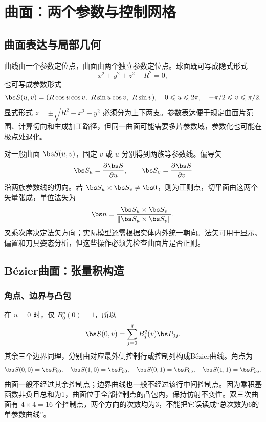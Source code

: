 \chapter{曲面：两个参数与控制网格}
\label{ch:surfaces}

\section{曲面表达与局部几何}

曲线由一个参数定位点，曲面由两个独立参数定位点。球面既可写成隐式形式
\[
 x^2+y^2+z^2-R^2=0,
\]
也可写成参数形式
\[
 \bs S(u,v)=(R\cos u\cos v,\ R\sin u\cos v,\ R\sin v),
 \quad0\leq u\leq2\pi,\quad-\pi/2\leq v\leq\pi/2.
\]
显式形式 $z=\pm\sqrt{R^2-x^2-y^2}$ 必须分为上下两支。参数表达便于规定曲面片范围、计算切向和生成加工路径，但同一曲面可能需要多片参数域，参数化也可能在极点处退化。

对一般曲面 $\bs S(u,v)$，固定 $v$ 或 $u$ 分别得到两族等参数线。偏导矢
\[
 \bs S_u=\frac{\partial\bs S}{\partial u},\qquad
 \bs S_v=\frac{\partial\bs S}{\partial v}
\]
沿两族参数线的切向。若 $\bs S_u\times\bs S_v\ne\bs0$，则为正则点，切平面由这两个矢量张成，单位法矢为
\[
 \bs n=\frac{\bs S_u\times\bs S_v}{\|\bs S_u\times\bs S_v\|}.
\]
叉乘次序决定法矢方向；实际模型还需根据实体内外统一朝向。法矢可用于显示、偏置和刀具姿态分析，但这些操作必须先检查曲面片是否正则。


\Needspace{6cm}
\section{Bézier曲面：张量积构造}



\subsection{角点、边界与凸包}
在 $u=0$ 时，仅 $B_0^p(0)=1$，所以
\[
 \bs S(0,v)=\sum_{j=0}^qB_j^q(v)\bs P_{0j}.
\]
其余三个边界同理，分别由对应最外侧控制行或控制列构成Bézier曲线。角点为
\[
 \bs S(0,0)=\bs P_{00},\quad\bs S(1,0)=\bs P_{p0},\quad
 \bs S(0,1)=\bs P_{0q},\quad\bs S(1,1)=\bs P_{pq}.
\]
曲面一般不经过其余控制点；边界曲线也一般不经过该行中间控制点。因为乘积基函数非负且总和为1，曲面位于全部控制点的凸包内，保持仿射不变性。双三次曲面有 $4\times4=16$ 个控制点，两个方向的次数均为3，不能把它误读成“总次数为6的单参数曲线”。


